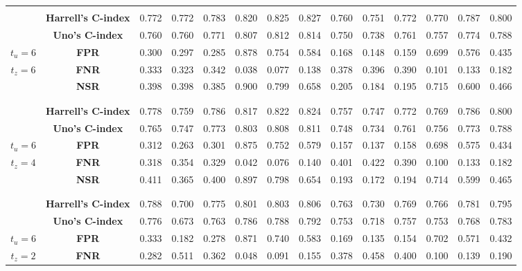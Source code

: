 \begin{table}[!htbp]
\begin{tabular}{c|c|cccccc|cccccc}
\hline
& & & & & & & & & & & & & \\
 & {\bf Harrell’s C-index} & 0.772 & 0.772 & 0.783 & 0.820 & 0.825 & 0.827 & 0.760 & 0.751 & 0.772 & 0.770 & 0.787 & 0.800 \\
 & {\bf Uno's C-index} & 0.760 & 0.760 & 0.771 & 0.807 & 0.812 & 0.814 & 0.750 & 0.738 & 0.761 & 0.757 & 0.774 & 0.788 \\
$t_u=6$ & {\bf FPR} & 0.300 & 0.297 & 0.285 & 0.878 & 0.754 & 0.584 & 0.168 & 0.148 & 0.159 & 0.699 & 0.576 & 0.435 \\
$t_z=6$ & {\bf FNR} & 0.333 & 0.323 & 0.342 & 0.038 & 0.077 & 0.138 & 0.378 & 0.396 & 0.390 & 0.101 & 0.133 & 0.182 \\
 & {\bf NSR} & 0.398 & 0.398 & 0.385 & 0.900 & 0.799 & 0.658 & 0.205 & 0.184 & 0.195 & 0.715 & 0.600 & 0.466 \\
& & & & & & & & & & & & & \\
\hline
& & & & & & & & & & & & & \\
 & {\bf Harrell’s C-index} & 0.778 & 0.759 & 0.786 & 0.817 & 0.822 & 0.824 & 0.757 & 0.747 & 0.772 & 0.769 & 0.786 & 0.800 \\
 & {\bf Uno's C-index} & 0.765 & 0.747 & 0.773 & 0.803 & 0.808 & 0.811 & 0.748 & 0.734 & 0.761 & 0.756 & 0.773 & 0.788 \\
$t_u=6$ & {\bf FPR} & 0.312 & 0.263 & 0.301 & 0.875 & 0.752 & 0.579 & 0.157 & 0.137 & 0.158 & 0.698 & 0.575 & 0.434 \\
$t_z=4$ & {\bf FNR} & 0.318 & 0.354 & 0.329 & 0.042 & 0.076 & 0.140 & 0.401 & 0.422 & 0.390 & 0.100 & 0.133 & 0.182 \\
 & {\bf NSR} & 0.411 & 0.365 & 0.400 & 0.897 & 0.798 & 0.654 & 0.193 & 0.172 & 0.194 & 0.714 & 0.599 & 0.465 \\
& & & & & & & & & & & & & \\
\hline
& & & & & & & & & & & & & \\
 & {\bf Harrell’s C-index} & 0.788 & 0.700 & 0.775 & 0.801 & 0.803 & 0.806 & 0.763 & 0.730 & 0.769 & 0.766 & 0.781 & 0.795 \\
 & {\bf Uno's C-index} & 0.776 & 0.673 & 0.763 & 0.786 & 0.788 & 0.792 & 0.753 & 0.718 & 0.757 & 0.753 & 0.768 & 0.783 \\
$t_u=6$ & {\bf FPR} & 0.333 & 0.182 & 0.278 & 0.871 & 0.740 & 0.583 & 0.169 & 0.135 & 0.154 & 0.702 & 0.571 & 0.432 \\
$t_z=2$ & {\bf FNR} & 0.282 & 0.511 & 0.362 & 0.048 & 0.091 & 0.155 & 0.378 & 0.458 & 0.400 & 0.100 & 0.139 & 0.190 \\

\end{tabular}
\end{table}
